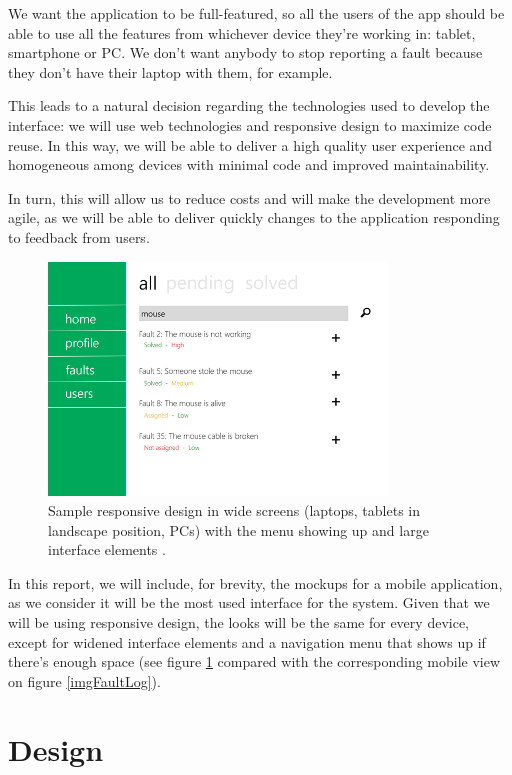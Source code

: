 \documentclass{report}
\begin{document}
We want the application to be full-featured, so all the users of the app should be able to use all the features from whichever device they're working in: tablet, smartphone or PC. We don't want anybody to stop reporting a fault because they don't have their laptop with them, for example.

This leads to a natural decision regarding the technologies used to develop the interface: we will use web technologies and responsive design to maximize code reuse. In this way, we will be able to deliver a high quality user experience and homogeneous among devices with minimal code and improved maintainability.

In turn, this will allow us to reduce costs and will make the development more agile, as we will be able to deliver quickly changes to the application responding to feedback from users.


\begin{figure}[hbtp]
\centering
\includegraphics[width=0.8\textwidth]{img/WideScreens.png}
\caption{Sample responsive design in wide screens (laptops, tablets in landscape position, PCs) with the menu showing up and large interface elements .}
\label{imgWideScreens}
\end{figure}

In this report, we will include, for brevity, the mockups for a mobile application, as we consider it will be the most used interface for the system. Given that we will be using responsive design, the looks will be the same for every device, except for widened interface elements and a navigation menu that shows up if there's enough space (see figure \ref{imgWideScreens} compared with the corresponding mobile view on figure  \ref{imgFaultLog}).

\section{Design}
\end{document}
